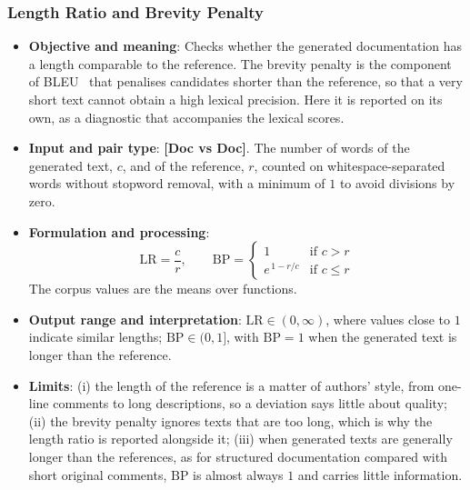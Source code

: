 \subsubsection{Length Ratio and Brevity Penalty}
\label{subsubsec:length_brevity}
\begin{itemize}[leftmargin=*, label=\textbullet]
	\item \textbf{Objective and meaning}: Checks whether the generated documentation has a length
	comparable to the reference. The brevity penalty is the component of BLEU~\cite{papineni_bleu_2002}
	that penalises candidates shorter than the reference, so that a very short text cannot obtain a
	high lexical precision. Here it is reported on its own, as a diagnostic that accompanies the
	lexical scores.

	\item \textbf{Input and pair type}: \textbf{[Doc vs Doc]}. The number of words of the generated
	text, $c$, and of the reference, $r$, counted on whitespace-separated words without stopword
	removal, with a minimum of $1$ to avoid divisions by zero.

	\item \textbf{Formulation and processing}:
	\begin{equation}
		\mathrm{LR} = \frac{c}{r}, \qquad
		\mathrm{BP} =
		\begin{cases}
			1 & \text{if } c > r \\
			e^{\,1 - r/c} & \text{if } c \le r
		\end{cases}
		\label{eq:brevity_penalty}
	\end{equation}
	The corpus values are the means over functions.

	\item \textbf{Output range and interpretation}: $\mathrm{LR}\in(0,\infty)$, where values close to
	$1$ indicate similar lengths; $\mathrm{BP}\in(0,1]$, with $\mathrm{BP}=1$ when the generated text
	is longer than the reference.

	\item \textbf{Limits}: (i) the length of the reference is a matter of authors' style, from
	one-line comments to long descriptions, so a deviation says little about quality; (ii) the
	brevity penalty ignores texts that are too long, which is why the length ratio is reported
	alongside it; (iii) when generated texts are generally longer than the references, as for
	structured documentation compared with short original comments, $\mathrm{BP}$ is almost always
	$1$ and carries little information.
\end{itemize}

